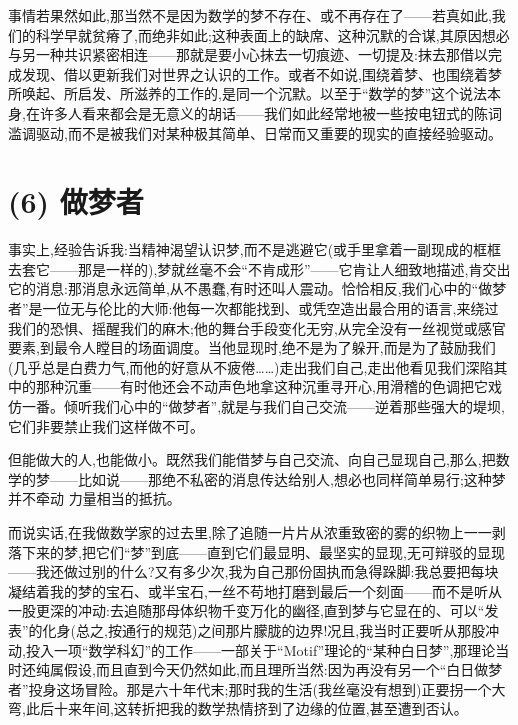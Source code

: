 事情若果然如此,那当然不是因为数学的梦不存在、或不再存在了——若真如此,我们的科学早就贫瘠了,而绝非如此;这种表面上的缺席、这种沉默的合谋,其原因想必与另一种共识紧密相连——那就是要小心抹去一切痕迹、一切提及:抹去那借以完成发现、借以更新我们对世界之认识的工作。或者不如说,围绕着梦、也围绕着梦所唤起、所启发、所滋养的工作的,是同一个沉默。以至于“数学的梦”这个说法本身,在许多人看来都会是无意义的胡话——我们如此经常地被一些按电钮式的陈词滥调驱动,而不是被我们对某种极其简单、日常而又重要的现实的直接经验驱动。

\section{(6) 做梦者}

事实上,经验告诉我:当精神渴望认识梦,而不是逃避它(或手里拿着一副现成的框框去套它——那是一样的),梦就丝毫不会“不肯成形”——它肯让人细致地描述,肯交出它的消息:那消息永远简单,从不愚蠢,有时还叫人震动。恰恰相反,我们心中的“做梦者”是一位无与伦比的大师:他每一次都能找到、或凭空造出最合用的语言,来绕过我们的恐惧、摇醒我们的麻木;他的舞台手段变化无穷,从完全没有一丝视觉或感官要素,到最令人瞠目的场面调度。当他显现时,绝不是为了躲开,而是为了鼓励我们(几乎总是白费力气,而他的好意从不疲倦……)走出我们自己,走出他看见我们深陷其中的那种沉重——有时他还会不动声色地拿这种沉重寻开心,用滑稽的色调把它戏仿一番。倾听我们心中的“做梦者”,就是与我们自己交流——逆着那些强大的堤坝,它们非要禁止我们这样做不可。

但能做大的人,也能做小。既然我们能借梦与自己交流、向自己显现自己,那么,把数学的梦——比如说——那绝不私密的消息传达给别人,想必也同样简单易行;这种梦并不牵动
 力量相当的抵抗。

而说实话,在我做数学家的过去里,除了追随一片片从浓重致密的雾的织物上一一剥落下来的梦,把它们“梦”到底——直到它们最显明、最坚实的显现,无可辩驳的显现——我还做过别的什么?又有多少次,我为自己那份固执而急得跺脚:我总要把每块凝结着我的梦的宝石、或半宝石,一丝不苟地打磨到最后一个刻面——而不是听从一股更深的冲动:去追随那母体织物千变万化的幽径,直到梦与它显在的、可以“发表”的化身(总之,按通行的规范)之间那片朦胧的边界!况且,我当时正要听从那股冲动,投入一项“数学科幻”的工作——一部关于“Motif”理论的“某种白日梦”,那理论当时还纯属假设,而且直到今天仍然如此,而且理所当然:因为再没有另一个“白日做梦者”投身这场冒险。那是六十年代末;那时我的生活(我丝毫没有想到)正要拐一个大弯,此后十来年间,这转折把我的数学热情挤到了边缘的位置,甚至遭到否认。

